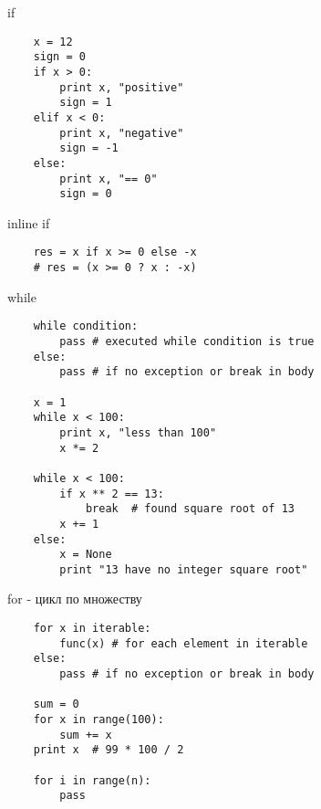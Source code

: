 \documentclass{article}
\begin{document}
\begin{center} if \end{center}
\vspace{15pt}
\begin{lstlisting}
	x = 12
	sign = 0
	if x > 0:
	    print x, "positive"
	    sign = 1
	elif x < 0:
	    print x, "negative"
	    sign = -1
	else:
	    print x, "== 0"
	    sign = 0
\end{lstlisting}
\newpage

\begin{center} inline if \end{center}
\vspace{15pt}
\begin{lstlisting}
	res = x if x >= 0 else -x
	# res = (x >= 0 ? x : -x)
\end{lstlisting}
\newpage

\begin{center} while \end{center}
\vspace{15pt}
\begin{lstlisting}
	while condition:
		pass # executed while condition is true
	else:
		pass # if no exception or break in body

	x = 1
	while x < 100:
		print x, "less than 100"
		x *= 2

	while x < 100:
		if x ** 2 == 13:
			break  # found square root of 13
		x += 1
	else:
		x = None
		print "13 have no integer square root"
\end{lstlisting}
\newpage

\begin{center} for - цикл по множеству \end{center}
\vspace{15pt}
\begin{lstlisting}
	for x in iterable:
		func(x) # for each element in iterable
	else:
		pass # if no exception or break in body

	sum = 0
	for x in range(100):
		sum += x
	print x  # 99 * 100 / 2

	for i in range(n):
	    pass

\end{lstlisting}
\newpage
\end{document}
